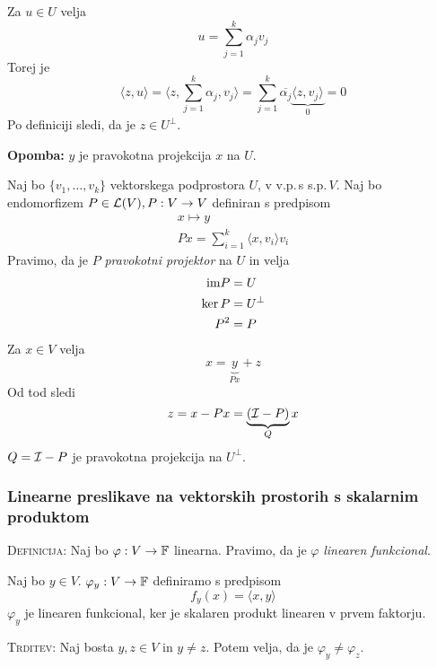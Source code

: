 Za $u \in U$ velja
\begin{equation*}
u = \sum_{j=1}^k \alpha_j v_j
\end{equation*}
Torej je
\begin{equation*}
\langle z, u \rangle = \langle z, \sum_{j=1}^k \alpha_j, v_j \rangle = \sum_{j=1}^k \overline{\alpha_j} \underbrace{\langle z, v_j \rangle}_0 = 0
\end{equation*}
Po definiciji sledi, da je $z \in U^\perp$.

\textbf{Opomba:} $y$ je pravokotna projekcija $x$ na $U$.

Naj bo $\{ v_1, \ldots, v_k \}$ \ONB vektorskega podprostora $U$, v v.p.\,s s.p.\,$V$. Naj bo endomorfizem $P \in \mathcal{L}(V), P: V \to V$ definiran s predpisom
\begin{gather*}
x \mapsto y \\
P x = \sum_{i=1}^k \langle x, v_i \rangle v_i
\end{gather*}
Pravimo, da je $P$ \emph{pravokotni projektor} na $U$ in velja
\begin{align*}
\text{im} P &= U \\
\ker P &= U^\perp \\
P^2 &= P
\end{align*}
Za $x \in  V$ velja
\begin{equation*}
x = \underbrace{y}_{Px} + z
\end{equation*}
Od tod sledi 
\begin{equation*}
z = x - Px = \underbrace{(\mathcal{I} - P)}_Q x
\end{equation*}
$Q = \mathcal{I} - P$ je pravokotna projekcija na $U^\perp$.

\subsubsection{Linearne preslikave na vektorskih prostorih s skalarnim produktom}
\textsc{Definicija:} Naj bo $\varphi: V \to \operatorname{\mathbb{F}}$ linearna. Pravimo, da je $\varphi$ \emph{linearen funkcional}.

Naj bo $y \in V$. $\varphi_y: V \to \operatorname{\mathbb{F}}$ definiramo s predpisom
\begin{equation*}
f_y(x) = \langle x, y \rangle
\end{equation*}
$\varphi_y$ je linearen funkcional, ker je skalaren produkt linearen v prvem faktorju.

\textsc{Trditev:} Naj bosta $y, z \in V$ in $y \neq z$. Potem velja, da je $\varphi_y \neq \varphi_z$.

